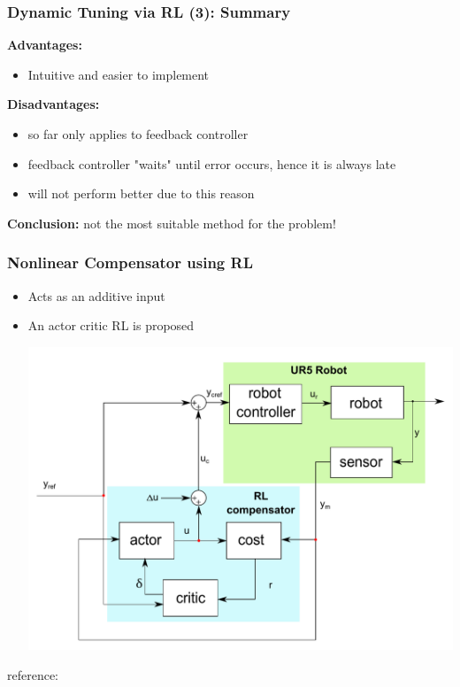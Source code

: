\documentclass{beamer}
\begin{document}
			\begin{frame}\frametitle{Dynamic Tuning via RL (3): Summary}				
				\vspace{3mm}
				\textbf{Advantages:}
				\begin{itemize}
					\item Intuitive and easier to implement
				\end{itemize}
				\vspace{3mm}
				\pause
				\textbf{Disadvantages:}
				\begin{itemize}
					\item so far only applies to feedback controller
					\item feedback controller "waits" until error occurs, hence it is always late
					\item  will not perform better due to this reason					
				\end{itemize}
				\pause
				\textbf{Conclusion:} not the most suitable method for the problem!
			\end{frame}	
						
			\begin{frame}\frametitle{Nonlinear Compensator using RL}
				\vspace{3mm}
				\fontsize{8}{4}\selectfont 
				\begin{itemize}
					\item Acts as an additive input
					\item An actor critic RL is proposed
					
					\begin{center}
						\includegraphics[width=0.80\linewidth]{images/nonlin_compensator}
					\end{center}
				\end{itemize}
				\centering
				\fontsize{8}{4}\selectfont reference: \citet{Efe2014}
			\end{frame}		
			
\end{document}
